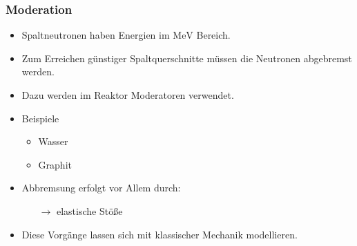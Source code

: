 \documentclass{beamer}[9pt]
\begin{document}
\begin{frame}
\frametitle{Moderation}
\begin{itemize}
\item Spaltneutronen haben Energien im $\si{\mega\eV}$ Bereich.
\item Zum Erreichen günstiger Spaltquerschnitte müssen die Neutronen abgebremst werden.
\item Dazu werden im Reaktor Moderatoren verwendet.
\item Beispiele

\begin{itemize}
\item Wasser
\item Graphit
\end{itemize}

\item Abbremsung erfolgt vor Allem durch:
\begin{itemize}
\item[$\rightarrow$] elastische Stöße

\end{itemize}
\item Diese Vorgänge lassen sich mit klassischer Mechanik modellieren.
\end{itemize}

\end{frame}
\end{document}
